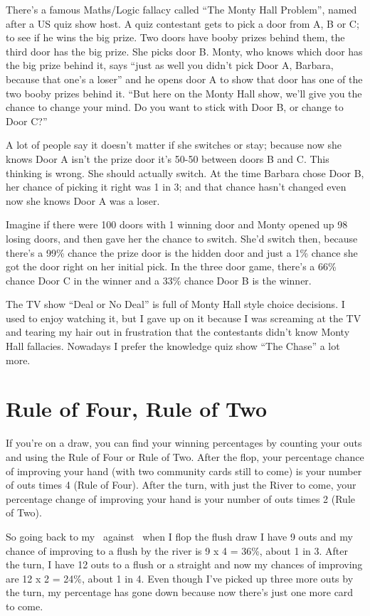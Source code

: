 There's a famous Maths/Logic fallacy called ``The Monty Hall
Problem'', named after a US quiz show host. A quiz contestant gets to
pick a door from A, B or C; to see if he wins the big prize. Two doors
have booby prizes behind them, the third door has the big prize. She picks
door B. Monty, who knows which door has the big prize behind it, says
``just as well you didn't pick Door A, Barbara, because that one's a
loser'' and he opens door A to show that door has one of the two booby
prizes behind it. ``But here on the Monty Hall show, we'll give you the
chance to change your mind. Do you want to stick with Door B, or
change to Door C?''

A lot of people say it doesn't matter if she switches or stay; because
now she knows Door A isn't the prize door it's 50-50 between doors B
and C. This thinking is wrong. She should actually switch. At the time
Barbara chose Door B, her chance of picking it right was 1 in 3; and
that chance hasn't changed even now she knows Door A was a loser.

Imagine if there were 100 doors with 1 winning door and Monty opened
up 98 losing doors, and then gave her the chance to
switch. She'd switch then, because there's a 99\% chance the prize
door is the hidden door and just a 1\% chance she got the door right
on her initial pick. In the three door game, there's a 66\% chance
Door C in the winner and a 33\% chance Door B is the winner.

The TV show ``Deal or No Deal'' is full of Monty Hall style choice
decisions. I used to enjoy watching it, but I gave up on it because I
was screaming at the TV and tearing my hair out in frustration that
the contestants didn't know Monty Hall fallacies. Nowadays I prefer the
knowledge quiz show ``The Chase'' a lot more.

\section{Rule of Four, Rule of Two}

If you're on a draw, you can find your winning percentages by counting
your outs and using the Rule of Four or Rule of Two. After the flop,
your percentage chance of improving your hand (with two community
cards still to come) is your number of outs
times 4 (Rule of Four). After the turn, with just the River to come,
your percentage change of improving your hand is your number of outs
times 2 (Rule of Two).

So going back to my \fourd\tred\ against \As\Js\, when I flop the
flush draw I have 9 outs and my chance of improving to a flush by the
river is 9 x 4 = 36\%, about 1 in 3. After the turn, I have 12 outs to
a flush or a straight and now my chances of improving are 12 x 2 =
24\%, about 1 in 4. Even though I've picked up three more outs by the
turn, my percentage has gone down because now there's just one more
card to come.

